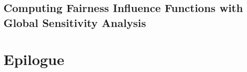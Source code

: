 \documentclass[12pt]{report}
\makeatletter
\newcommand\backmatter{%
	\if@openright
	\cleardoublepage
	\else
	\clearpage
	\fi
}
\makeatother
\begin{document}
			\chapter{Computing Fairness Influence Functions with Global Sensitivity Analysis}				
%				
				
%				
				
				
				
					
			
		\part{Epilogue}
	\backmatter
	
	
%	
	
	
	
	
\end{document}
